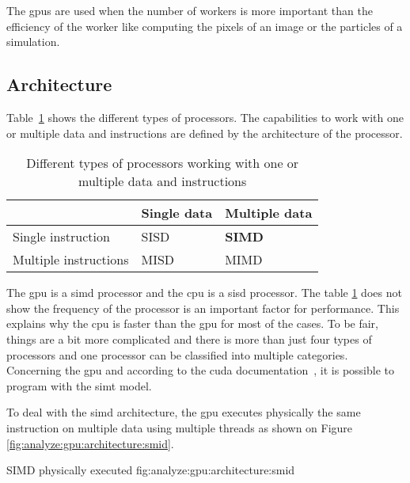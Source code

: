 The \acrshort{gpu}s are used when the number of workers is more important than
the efficiency of the worker like computing the pixels of an image or the
particles of a simulation.




\subsection{Architecture}
\label{ch:analyze:gpu:architecture}

Table~\ref{tab:analyze:gpu:architecture:instruction-data} shows the
different types of processors.
The capabilities to work with one or multiple data and instructions are defined
by the architecture of the processor.

\begin{table}[ht]
    \centering
    \begin{tabular}{l|l|l|}
                          & Single data & Multiple data \\ \hline
    Single instruction    & SISD        & \textbf{SIMD}  \\ \hline
    Multiple instructions & MISD        & MIMD           \\ \hline
    \end{tabular}
    \caption{Different types of processors working with one or multiple data and instructions}
    \label{tab:analyze:gpu:architecture:instruction-data}
\end{table}

The \acrshort{gpu} is a \acrshort{simd} processor and the \acrshort{cpu} is a
\acrshort{sisd} processor.
The table \ref{tab:analyze:gpu:architecture:instruction-data} does not show the
frequency of the processor is an important factor for performance.
This explains why the \acrshort{cpu} is faster than the \acrshort{gpu}
for most of the cases.
To be fair, things are a bit more complicated and there is more than just
four types of processors and one processor can be classified into multiple
categories.
Concerning the \acrshort{gpu} and according to the \acrshort{cuda}
documentation~\cite{cuda-programming-simt}, it is possible to program with the
\acrlong{simt} model.

To deal with the \acrshort{simd} architecture, the \acrshort{gpu} executes
physically the same instruction on multiple data using multiple threads as shown
on Figure \ref{fig:analyze:gpu:architecture:smid}.

{SIMD physically executed}
{fig:analyze:gpu:architecture:smid}

